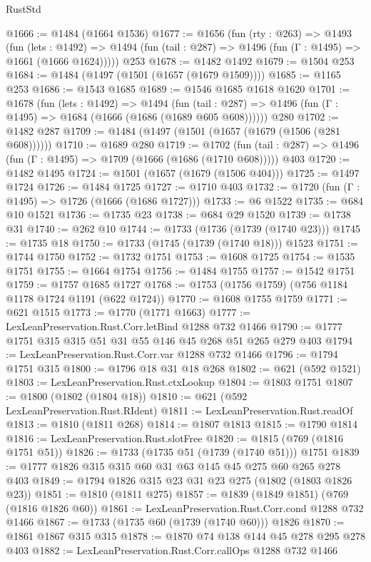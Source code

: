 \begin{lexlean}{RustStd}
\begin{coremodule}
@1666 := @1484 (@1664 @1536)
@1677 := @1656
    (fun (rty : @263) =>
    @1493
      (fun (lets : @1492) =>
      @1494 (fun (tail : @287) => @1496 (fun (Γ : @1495) => @1661 (@1666 @1624)))))
    @253
@1678 := @1482 @1492
@1679 := @1504 @253
@1684 := @1484 (@1497 (@1501 (@1657 (@1679 @1509))))
@1685 := @1165 @253
@1686 := @1543 @1685
@1689 := @1546 @1685 @1618 @1620
@1701 := @1678
    (fun (lets : @1492) =>
    @1494 (fun (tail : @287) => @1496 (fun (Γ : @1495) => @1684 (@1666 (@1686 (@1689 @605 @608))))))
    @280
@1702 := @1482 @287
@1709 := @1484 (@1497 (@1501 (@1657 (@1679 (@1506 (@281 @608))))))
@1710 := @1689 @280
@1719 := @1702
    (fun (tail : @287) => @1496 (fun (Γ : @1495) => @1709 (@1666 (@1686 (@1710 @608)))))
    @403
@1720 := @1482 @1495
@1724 := @1501 (@1657 (@1679 (@1506 @404)))
@1725 := @1497 @1724
@1726 := @1484 @1725
@1727 := @1710 @403
@1732 := @1720 (fun (Γ : @1495) => @1726 (@1666 (@1686 @1727)))
@1733 := @6 @1522
@1735 := @684 @10 @1521
@1736 := @1735 @23
@1738 := @684 @29 @1520
@1739 := @1738 @31
@1740 := @262 @10
@1744 := @1733 (@1736 (@1739 (@1740 @23)))
@1745 := @1735 @18
@1750 := @1733 (@1745 (@1739 (@1740 @18))) @1523
@1751 := @1744 @1750
@1752 := @1732 @1751
@1753 := @1608 @1725
@1754 := @1535 @1751
@1755 := @1664 @1754
@1756 := @1484 @1755
@1757 := @1542 @1751
@1759 := @1757 @1685 @1727
@1768 := @1753 (@1756 @1759) (@756 @1184 @1178 @1724 @1191 (@622 @1724))
@1770 := @1608 @1755 @1759
@1771 := @621 @1515
@1773 := @1770 (@1771 @1663)
@1777 := LexLeanPreservation.Rust.Corr.letBind @1288 @732 @1466
@1790 := @1777 @1751 @315 @315 @51 @31 @55 @146 @45 @268 @51 @265 @279 @403
@1794 := LexLeanPreservation.Rust.Corr.var @1288 @732 @1466
@1796 := @1794 @1751 @315
@1800 := @1796 @18 @31 @18 @268
@1802 := @621 (@592 @1521)
@1803 := LexLeanPreservation.Rust.ctxLookup
@1804 := @1803 @1751
@1807 := @1800 (@1802 (@1804 @18))
@1810 := @621 (@592 LexLeanPreservation.Rust.RIdent)
@1811 := LexLeanPreservation.Rust.readOf
@1813 := @1810 (@1811 @268)
@1814 := @1807 @1813
@1815 := @1790 @1814
@1816 := LexLeanPreservation.Rust.slotFree
@1820 := @1815 (@769 (@1816 @1751 @51))
@1826 := @1733 (@1735 @51 (@1739 (@1740 @51))) @1751
@1839 := @1777 @1826 @315 @315 @60 @31 @63 @145 @45 @275 @60 @265 @278 @403
@1849 := @1794 @1826 @315 @23 @31 @23 @275 (@1802 (@1803 @1826 @23))
@1851 := @1810 (@1811 @275)
@1857 := @1839 (@1849 @1851) (@769 (@1816 @1826 @60))
@1861 := LexLeanPreservation.Rust.Corr.cond @1288 @732 @1466
@1867 := @1733 (@1735 @60 (@1739 (@1740 @60))) @1826
@1870 := @1861 @1867 @315 @315
@1878 := @1870 @74 @138 @144 @45 @278 @295 @278 @403
@1882 := LexLeanPreservation.Rust.Corr.callOps @1288 @732 @1466

\end{coremodule}
\end{lexlean}

